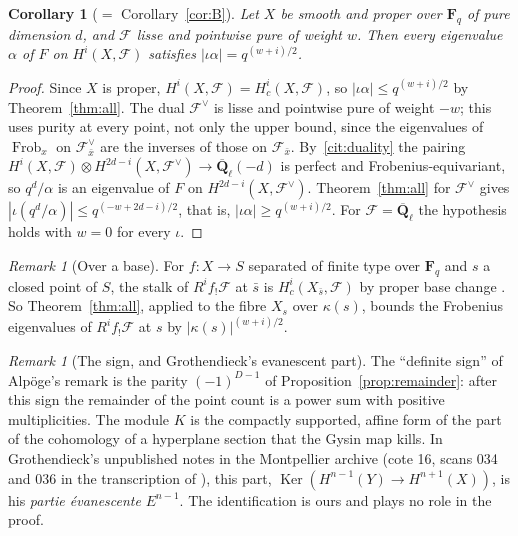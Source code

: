 \documentclass[11pt,a4paper]{article}
\theoremstyle{plain}
\newtheorem{corollary}[theorem]{Corollary}
\theoremstyle{definition}
\theoremstyle{remark}
\newtheorem{remark}[theorem]{Remark}
\newcommand{\uses}[1]{\par\noindent{\small\textsf{Uses:} #1}\par\smallskip}
\newcommand{\Fq}{\mathbf F_q}
\newcommand{\Ql}{\overline{\mathbf Q}_\ell}
\newcommand{\F}{\mathcal F}
\newcommand{\Frob}{\operatorname{Frob}}
\begin{document}
\uses{Theorem~\ref{thm:middle}; Lemma~\ref{lem:good}; \ref{cit:artin}, \ref{cit:duality}, \ref{cit:local}.}

\begin{corollary}[$=$ Corollary~\ref{cor:B}]\label{cor:pure}
Let $X$ be smooth and proper over $\Fq$ of pure dimension $d$, and $\F$ lisse and pointwise pure of weight $w$. Then every
eigenvalue $\alpha$ of $F$ on $H^i(X,\F)$ satisfies $|\iota\alpha|=q^{(w+i)/2}$.
\end{corollary}
\begin{proof}
Since $X$ is proper, $H^i(X,\F)=H^i_c(X,\F)$, so $|\iota\alpha|\le q^{(w+i)/2}$ by Theorem~\ref{thm:all}. The dual
$\F^\vee$ is lisse and pointwise pure of weight $-w$; this uses purity at every point, not only the upper bound, since the
eigenvalues of $\Frob_x$ on $\F^\vee_{\bar x}$ are the inverses of those on $\F_{\bar x}$. By~\ref{cit:duality} the pairing
$H^i(X,\F)\otimes H^{2d-i}(X,\F^\vee)\to\Ql(-d)$ is perfect and Frobenius-equivariant, so $q^d/\alpha$ is an eigenvalue of
$F$ on $H^{2d-i}(X,\F^\vee)$. Theorem~\ref{thm:all} for $\F^\vee$ gives $|\iota(q^d/\alpha)|\le q^{(-w+2d-i)/2}$, that is,
$|\iota\alpha|\ge q^{(w+i)/2}$. For $\F=\Ql$ the hypothesis holds with $w=0$ for every $\iota$.
\end{proof}
\uses{Theorem~\ref{thm:all}; \ref{cit:duality}.}

\begin{remark}[Over a base]
For $f:X\to S$ separated of finite type over $\Fq$ and $s$ a closed point of $S$, the stalk of $R^if_!\F$ at $\bar s$ is
$H^i_c(X_{\bar s},\F)$ by proper base change \cite[XVII, \S5]{SGA4}. So Theorem~\ref{thm:all}, applied to the fibre
$X_s$ over $\kappa(s)$, bounds the Frobenius eigenvalues of $R^if_!\F$ at $s$ by $|\kappa(s)|^{(w+i)/2}$.
\end{remark}

\begin{remark}[The sign, and Grothendieck's evanescent part]
The ``definite sign'' of Alp\"oge's remark \cite{Alpoge} is the parity $(-1)^{D-1}$ of Proposition~\ref{prop:remainder}:
after this sign the remainder of the point count is a power sum with positive multiplicities. The module $K$ is the
compactly supported, affine form of the part of the cohomology of a hyperplane section that the Gysin map kills. In
Grothendieck's unpublished notes in the Montpellier archive (cote 16, scans 034 and 036 in the transcription of
\cite{Archive}), this part, $\operatorname{Ker}(H^{n-1}(Y)\to H^{n+1}(X))$, is his \emph{partie \'evanescente}
$E^{n-1}$. The identification is ours and plays no role in the proof.
\end{remark}
\end{document}
